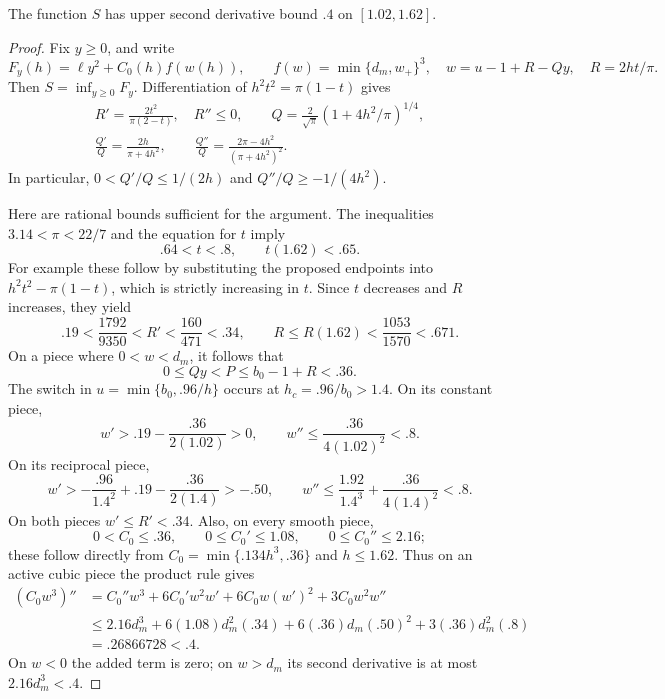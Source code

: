 \begin{lemma}\label{num:s-second}
The function $S$ has upper second derivative bound $.4$ on
$[1.02,1.62]$.
\end{lemma}

\begin{proof}
Fix $y\ge0$, and write
\[
 F_y(h)=\ell y^2+C_0(h)f(w(h)),\qquad
 f(w)=\min\{d_m,w_+\}^3,
 \quad w=u-1+R-Qy,\quad R=2ht/\pi.
\]
Then $S=\inf_{y\ge0}F_y$. Differentiation of
$h^2t^2=\pi(1-t)$ gives
\begin{equation}\label{num:r-q-derivatives}
 \begin{gathered}
 R'=\frac{2t^2}{\pi(2-t)},\quad R''\le0,
 \qquad Q=\frac2{\sqrt\pi}(1+4h^2/\pi)^{1/4},\\
 \frac{Q'}Q=\frac{2h}{\pi+4h^2},\qquad
 \frac{Q''}Q=\frac{2\pi-4h^2}{(\pi+4h^2)^2}.
 \end{gathered}
\end{equation}
In particular, $0<Q'/Q\le1/(2h)$ and
$Q''/Q\ge-1/(4h^2)$.

Here are rational bounds sufficient for the argument. The inequalities
$3.14<\pi<22/7$ and the equation for $t$ imply
\[
 .64<t<.8,\qquad t(1.62)<.65.
\]
For example these follow by substituting the proposed endpoints into
$h^2t^2-\pi(1-t)$, which is strictly increasing in $t$.
Since $t$ decreases and $R$ increases, they yield
\[
 .19<\frac{1792}{9350}<R'
 <\frac{160}{471}<.34,
 \qquad
 R\le R(1.62)<\frac{1053}{1570}<.671.
\]
On a piece where $0<w<d_m$, it follows that
\[
 0\le Qy<P\le b_0-1+R<.36.
\]
The switch in $u=\min\{b_0,.96/h\}$ occurs at
$h_c=.96/b_0>1.4$. On its constant piece,
\[
 w'>.19-\frac{.36}{2(1.02)}>0,
 \qquad w''\le\frac{.36}{4(1.02)^2}<.8.
\]
On its reciprocal piece,
\[
 w'>-\frac{.96}{1.4^2}+.19-\frac{.36}{2(1.4)}>-.50,
 \qquad
 w''\le\frac{1.92}{1.4^3}+\frac{.36}{4(1.4)^2}<.8.
\]
On both pieces $w'\le R'<.34$. Also, on every smooth piece,
\[
 0<C_0\le.36,\qquad 0\le C_0'\le1.08,
 \qquad 0\le C_0''\le2.16;
\]
these follow directly from $C_0=\min\{.134h^3,.36\}$ and
$h\le1.62$.
Thus on an active cubic piece the product rule gives
\begin{align*}
 (C_0w^3)''
 &=C_0''w^3+6C_0'w^2w'+6C_0w(w')^2+3C_0w^2w''\\
 &\le2.16d_m^3+6(1.08)d_m^2(.34)
       +6(.36)d_m(.50)^2+3(.36)d_m^2(.8)\\
 &=.26866728<.4.
\end{align*}
On $w<0$ the added term is zero; on $w>d_m$ its second
derivative is at most $2.16d_m^3<.4$.


\end{proof}
